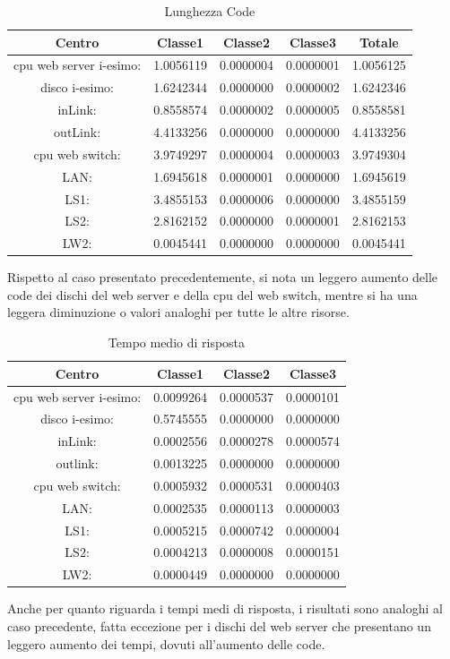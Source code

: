 \begin{table}[htbp]
\begin{center}
\begin{tabular}{||c|c|c|c|c||}
\hline
Centro &Classe1 &Classe2 &Classe3 &Totale\\
\hline
\hline
 cpu web server i-esimo: 	&1.0056119	&0.0000004	&0.0000001	&1.0056125\\
\hline
 disco i-esimo: 	&1.6242344	&0.0000000	&0.0000002	&1.6242346\\
\hline
 inLink: 	&0.8558574	&0.0000002	&0.0000005	&0.8558581\\
\hline
 outLink: 	&4.4133256	&0.0000000	&0.0000000	&4.4133256\\
\hline
 cpu web switch: 	&3.9749297	&0.0000004	&0.0000003	&3.9749304\\
\hline
 LAN: 	&1.6945618	&0.0000001	&0.0000000	&1.6945619\\
\hline
 LS1: 	&3.4855153	&0.0000006	&0.0000000	&3.4855159\\
\hline
 LS2: 	&2.8162152	&0.0000000	&0.0000001	&2.8162153\\
\hline
 LW2: 	&0.0045441	&0.0000000	&0.0000000	&0.0045441\\
\hline
\end{tabular}
\end{center}
\caption{Lunghezza Code}
\label{lunghezzacode}
\end{table}
Rispetto al caso presentato precedentemente, si nota un leggero aumento delle code dei dischi del web server e della cpu del web switch, mentre si ha una leggera diminuzione o valori analoghi per tutte le altre risorse.
\begin{table}[htbp]
\begin{center}
\begin{tabular}{||c|c|c|c||}
\hline
Centro &Classe1 &Classe2 &Classe3\\
\hline
\hline
 cpu web server i-esimo: 	&0.0099264	&0.0000537	&0.0000101\\
\hline
 disco i-esimo: 	&0.5745555	&0.0000000	&0.0000000\\
\hline
 inLink: 	&0.0002556	&0.0000278	&0.0000574\\
\hline
 outlink: 	&0.0013225	&0.0000000	&0.0000000\\
\hline
 cpu web switch: 	&0.0005932	&0.0000531	&0.0000403\\
\hline
 LAN: 	&0.0002535	&0.0000113	&0.0000003\\
\hline
 LS1: 	&0.0005215	&0.0000742	&0.0000004\\
\hline
 LS2: 	&0.0004213	&0.0000008	&0.0000151\\
\hline
 LW2: 	&0.0000449	&0.0000000	&0.0000000\\
\hline
\end{tabular}
\end{center}
\caption{Tempo medio di risposta}
\label{tempomediorisposta}
\end{table}
Anche per quanto riguarda i tempi medi di risposta, i risultati sono analoghi al caso precedente, fatta eccezione per i dischi del web server che presentano un leggero aumento dei tempi, dovuti all'aumento delle code.
